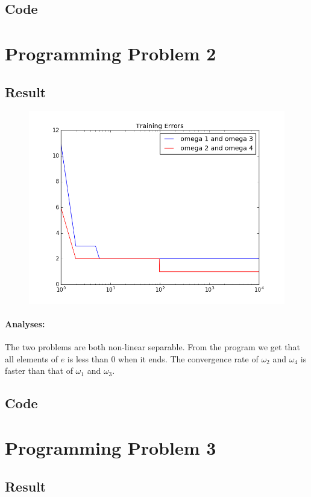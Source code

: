 \documentclass[]{article}
\begin{document}
    \subsection{Code}
    
    \section{Programming Problem 2}
    \subsection{Result}
    \begin{figure}[H]
        \centering
        \includegraphics[scale=0.5]{2.png}
    \end{figure}
    \paragraph{Analyses:}The two problems are both non-linear separable. From the program we get that all elements of $e$ is less than $0$ when it ends. The convergence rate of $\omega_2$ and $\omega_4$ is faster than that of $\omega_1$ and $\omega_3$.
    \subsection{Code}
    
    \section{Programming Problem 3}
    \subsection{Result}
\end{document}

